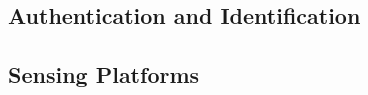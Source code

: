 \subsection{Authentication and Identification}
\label{Background:SensingWithEarables:Authentication}

\subsection{Sensing Platforms}
\label{Background:SensingWithEarables:SensingPlatforms}





